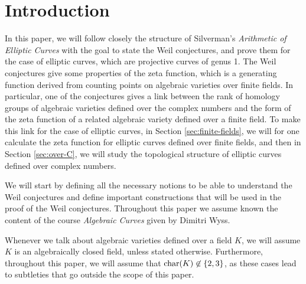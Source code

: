 \section*{Introduction}

In this paper, we will follow closely the structure of
Silverman's \emph{Arithmetic of Elliptic
Curves} \cite{silverman} with the goal to state the Weil conjectures,
and prove them for the case of elliptic curves, which are projective curves
of genus 1.
The Weil conjectures give some properties of the zeta function,
which is a generating
function derived from counting points on algebraic varieties over finite
fields.
In particular, one of the conjectures gives a link between
the rank of homology groups of algebraic varieties defined over the complex 
numbers and the form of the zeta function of a related algebraic variety
defined over a finite field. To make this link for the case of
elliptic curves, in Section \ref{sec:finite-fields}, we will for one calculate
the zeta function for elliptic curves defined over finite fields, and then
in Section \ref{sec:over-C}, we will study the topological structure of
elliptic curves defined
over complex numbers.

We will start by defining all the necessary notions to be able to understand
the Weil conjectures and define important constructions that will be used
in the proof of the Weil conjectures. 
Throughout this paper we assume known the content of the course \emph{Algebraic
Curves} given by Dimitri Wyss.

Whenever we talk about algebraic varieties defined over a field $K$, we
will assume $K$ is an algebraically closed field, unless stated otherwise.
Furthermore, throughout this paper, we will assume that
$\operatorname{char}(K) \not\in \{2, 3\}$, as these cases lead to subtleties that go outside
the scope of this paper.
